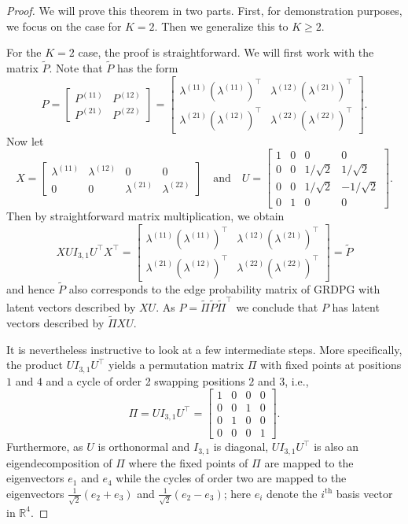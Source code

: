 \documentclass[12pt]{article}
\begin{document}
\begin{proof}
We will prove this theorem in two parts. First, for demonstration purposes, we focus on the case for $K = 2$. Then we generalize this to $K \geq 2$. 

For the $K = 2$ case, the proof is straightforward. We will first work with
the matrix $\tilde{P}$. Note that $\tilde{P}$ has the form
$$P = \begin{bmatrix} P^{(11)} & P^{(12)} \\ P^{(21)} &
  P^{(22)} \end{bmatrix} = \begin{bmatrix} \lambda^{(11)} (\lambda^{(11)})^\top & \lambda^{(12)} (\lambda^{(21)})^\top \\
  \lambda^{(21)} (\lambda^{(12)})^\top & \lambda^{(22)}
  (\lambda^{(22)})^\top \end{bmatrix}.$$
  Now let
$$X = \begin{bmatrix}
\lambda^{(11)} & \lambda^{(12)} & 0 & 0 \\
0 & 0 & \lambda^{(21)} & \lambda^{(22)}
\end{bmatrix} \quad \text{and} \quad
U = \begin{bmatrix} 1 & 0 & 0 & 0 \\
0 & 0 & 1 / \sqrt{2} & 1 / \sqrt{2} \\
0 & 0 & 1 / \sqrt{2} & - 1 / \sqrt{2} \\
0 & 1 & 0 & 0 \end{bmatrix}.$$
Then by straightforward matrix multiplication, we obtain 
$$X U I_{3, 1} U^\top X^\top =
\begin{bmatrix}
  \lambda^{(11)} (\lambda^{(11)})^\top & \lambda^{(12)} (\lambda^{(21)})^\top \\
  \lambda^{(21)} (\lambda^{(12)})^\top & \lambda^{(22)} (\lambda^{(22)})^\top
\end{bmatrix} = \tilde{P}$$
and hence $\tilde{P}$ also corresponds to the edge probability matrix of GRDPG
with latent vectors described by $X U$. As $P = \tilde{\Pi} \tilde{P}
\tilde{\Pi}^{\top}$ we conclude that $P$ has latent vectors described
by $\tilde{\Pi} X U$. 

It is nevertheless instructive to look at a few intermediate steps. 
More specifically, the product $U I_{3, 1} U^\top$ 
yields a permutation matrix $\Pi$ with fixed points at positions $1$ and $4$ 
and a cycle of order 2 swapping positions $2$ and $3$, i.e., 
$$\Pi = U I_{3, 1} U^\top = \begin{bmatrix} 1 & 0 & 0 & 0 \\
  0 & 0 & 1 & 0 \\
  0 & 1 & 0 & 0 \\
  0 & 0 & 0 & 1
\end{bmatrix}.$$
Furthermore, as $U$ is orthonormal and $I_{3, 1}$ is diagonal, 
$U I_{3, 1} U^\top$ is also an eigendecomposition of $\Pi$ where the fixed
points of $\Pi$ are mapped to the eigenvectors $e_1$ and $e_4$
while the cycles of order two are mapped to the eigenvectors  
$\tfrac{1}{\sqrt{2}}(e_{2} + e_3)$ and $\tfrac{1}{\sqrt{2}}(e_{2} -
e_3)$; here $e_i$ denote the $i^\mathrm{th}$ basis vector in $\mathbb{R}^{4}$.


\end{proof}
\end{document}
